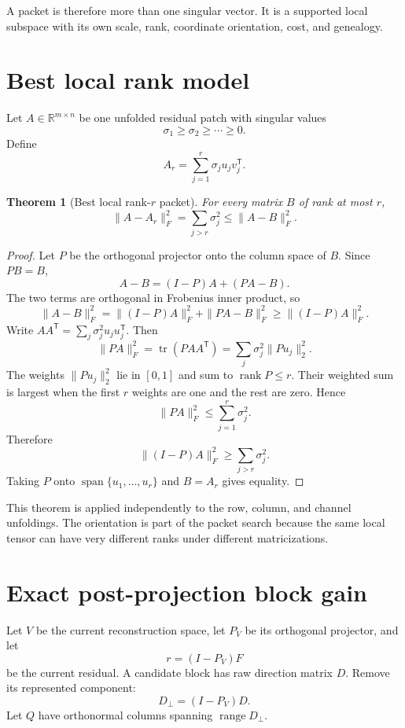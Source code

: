 \documentclass[11pt]{article}
\newtheorem{theorem}{Theorem}[section]
\theoremstyle{definition}
\theoremstyle{remark}
\newcommand{\R}{\mathbb R}
\begin{document}
A packet is therefore more than one singular vector. It is a supported local subspace with its own scale, rank, coordinate orientation, cost, and genealogy.

\section{Best local rank model}
Let $A\in\R^{m\times n}$ be one unfolded residual patch with singular values
\[
\sigma_1\ge\sigma_2\ge\cdots\ge0.
\]
Define
\[
A_r=\sum_{j=1}^{r}\sigma_j u_jv_j^{\mathsf T}.
\]

\begin{theorem}[Best local rank-$r$ packet]
For every matrix $B$ of rank at most $r$,
\[
\boxed{
\|A-A_r\|_F^2
=
\sum_{j>r}\sigma_j^2
\le
\|A-B\|_F^2.
}
\]
\end{theorem}

\begin{proof}
Let $P$ be the orthogonal projector onto the column space of $B$. Since $PB=B$,
\[
A-B=(I-P)A+(PA-B).
\]
The two terms are orthogonal in Frobenius inner product, so
\[
\|A-B\|_F^2
=
\|(I-P)A\|_F^2+
\|PA-B\|_F^2
\ge
\|(I-P)A\|_F^2.
\]
Write $AA^{\mathsf T}=\sum_j\sigma_j^2u_ju_j^{\mathsf T}$. Then
\[
\|PA\|_F^2
=
\operatorname{tr}(PAA^{\mathsf T})
=
\sum_j\sigma_j^2\|Pu_j\|_2^2.
\]
The weights $\|Pu_j\|_2^2$ lie in $[0,1]$ and sum to $\operatorname{rank}P\le r$. Their weighted sum is largest when the first $r$ weights are one and the rest are zero. Hence
\[
\|PA\|_F^2\le\sum_{j=1}^{r}\sigma_j^2.
\]
Therefore
\[
\|(I-P)A\|_F^2
\ge
\sum_{j>r}\sigma_j^2.
\]
Taking $P$ onto $\operatorname{span}\{u_1,\ldots,u_r\}$ and $B=A_r$ gives equality.
\end{proof}

This theorem is applied independently to the row, column, and channel unfoldings. The orientation is part of the packet search because the same local tensor can have very different ranks under different matricizations.

\section{Exact post-projection block gain}
Let $V$ be the current reconstruction space, let $P_V$ be its orthogonal projector, and let
\[
r=(I-P_V)F
\]
be the current residual. A candidate block has raw direction matrix $D$. Remove its represented component:
\[
D_\perp=(I-P_V)D.
\]
Let $Q$ have orthonormal columns spanning $\operatorname{range}D_\perp$.
\end{document}

